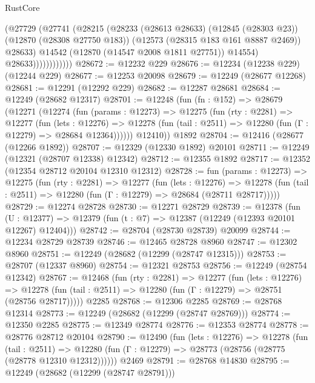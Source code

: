 \begin{lexlean}{RustCore}
\begin{coremodule}
                        (@27729
                          (@27741
                            (@28215
                              (@28233
                                (@28613 @28633)
                                (@12845 (@28303 @23))
                                (@12870 (@28308 @27750 @183))
                                (@12573 (@28315 @183 @161 @8887 @2469))
                                @28633)
                              @14542
                              (@12870 (@14547 @2008 @1811 @27751))
                              @14554)
                            @28633))))))))))))
@28672 := @12232 @229
@28676 := @12234 (@12238 @229) (@12244 @229)
@28677 := @12253 @20098
@28679 := @12249 (@28677 @12268)
@28681 := @12291 (@12292 @229)
@28682 := @12287 @28681
@28684 := @12249 (@28682 @12317)
@28701 := @12248
    (fun (fn : @152) =>
    @28679
      (@12271
        (@12274
          (fun (params : @12273) =>
          @12275
            (fun (rty : @2281) =>
            @12277
              (fun (lets : @12276) =>
              @12278 (fun (tail : @2511) => @12280 (fun (Γ : @12279) => @28684 @12364))))))
        @12410))
    @1892
@28704 := @12416 (@28677 (@12266 @1892))
@28707 := @12329 (@12330 @1892) @20101
@28711 := @12249 (@12321 (@28707 @12338) @12342)
@28712 := @12355 @1892
@28717 := @12352 (@12354 @28712 @20104 @12310 @12312)
@28728 := fun (params : @12273) =>
  @12275
    (fun (rty : @2281) =>
    @12277
      (fun (lets : @12276) =>
      @12278 (fun (tail : @2511) => @12280 (fun (Γ : @12279) => @28684 (@28711 @28717)))))
@28729 := @12274 @28728
@28730 := @12271 @28729
@28739 := @12378
    (fun (U : @12377) => @12379 (fun (t : @7) => @12387 (@12249 (@12393 @20101 @12267) @12404)))
@28742 := @28704 (@28730 @28739) @20099
@28744 := @12234 @28729 @28739
@28746 := @12465 @28728 @8960
@28747 := @12302 @8960
@28751 := @12249 (@28682 (@12299 (@28747 @12315)))
@28753 := @28707 (@12337 @8960)
@28754 := @12321 @28753
@28756 := @12249 (@28754 @12342)
@28767 := @12468
    (fun (rty : @2281) =>
    @12277
      (fun (lets : @12276) =>
      @12278 (fun (tail : @2511) => @12280 (fun (Γ : @12279) => @28751 (@28756 @28717)))))
    @2285
@28768 := @12306 @2285
@28769 := @28768 @12314
@28773 := @12249 (@28682 (@12299 (@28747 @28769)))
@28774 := @12350 @2285
@28775 := @12349 @28774
@28776 := @12353 @28774
@28778 := @28776 @28712 @20104
@28790 := @12490
    (fun (lets : @12276) =>
    @12278
      (fun (tail : @2511) =>
      @12280 (fun (Γ : @12279) => @28773 (@28756 (@28775 (@28778 @12310 @12312))))))
    @2469
@28791 := @28768 @14830
@28795 := @12249 (@28682 (@12299 (@28747 @28791)))

\end{coremodule}
\end{lexlean}
